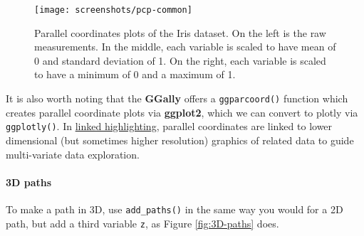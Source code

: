 \documentclass[12pt,]{isuthesis}
\newenvironment{Shaded}{\begin{snugshade}}{\end{snugshade}}
\newcommand{\KeywordTok}[1]{\textcolor[rgb]{0.13,0.29,0.53}{\textbf{{#1}}}}
\newcommand{\DataTypeTok}[1]{\textcolor[rgb]{0.13,0.29,0.53}{{#1}}}
\newcommand{\FloatTok}[1]{\textcolor[rgb]{0.00,0.00,0.81}{{#1}}}
\newcommand{\StringTok}[1]{\textcolor[rgb]{0.31,0.60,0.02}{{#1}}}
\newcommand{\NormalTok}[1]{{#1}}
\let\oldparagraph\paragraph
\renewcommand{\paragraph}[1]{\oldparagraph{#1}\mbox{}}
\begin{document}
\begin{Shaded}
\end{Shaded}

\begin{figure}
\centering
\texttt{[image: screenshots/pcp-common]}
\caption{\label{fig:pcp-common}Parallel coordinates plots of the Iris
dataset. On the left is the raw measurements. In the middle, each
variable is scaled to have mean of 0 and standard deviation of 1. On the
right, each variable is scaled to have a minimum of 0 and a maximum of
1.}
\end{figure}

It is also worth noting that the \textbf{GGally} offers a
\texttt{ggparcoord()} function which creates parallel coordinate plots
via \textbf{ggplot2}, which we can convert to plotly via
\texttt{ggplotly()}. In \protect\hyperlink{linked-highlighting}{linked
highlighting}, parallel coordinates are linked to lower dimensional (but
sometimes higher resolution) graphics of related data to guide
multi-variate data exploration.

\paragraph{3D paths}\label{d-paths}

To make a path in 3D, use \texttt{add\_paths()} in the same way you
would for a 2D path, but add a third variable \texttt{z}, as Figure
\ref{fig:3D-paths} does.
\end{document}
